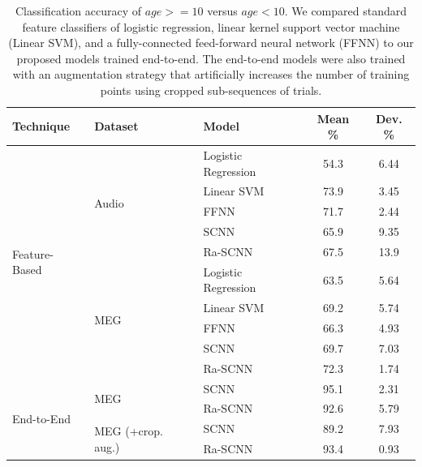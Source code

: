 \documentclass[fleqn,10pt]{wlscirep}
\begin{document}
\begin{table}[htp]
  \caption{Classification accuracy of $age >= 10$ versus $age < 10$. We compared standard feature classifiers of logistic regression, linear kernel support vector machine (Linear SVM), and a fully-connected feed-forward neural network (FFNN) to our proposed models trained end-to-end. The end-to-end models were also trained with an augmentation strategy that artificially increases the number of training points using cropped sub-sequences of trials.}
  \centering
  \begin{tabular}{l | l  l | c | c }
    \toprule
    \textbf{Technique} & \textbf{Dataset} & \textbf{Model} & \textbf{Mean \%} & \textbf{Dev. \%} \\
    \toprule
    \multirow{10}{*}{Feature-Based} & \multirow{5}{*}{Audio} & Logistic Regression      & 54.3 & 6.44  \\
                                    &                        & Linear SVM               & 73.9 & 3.45  \\
                                    &                        & FFNN                     & 71.7 & 2.44  \\
                                    &                        & SCNN                     & 65.9 & 9.35  \\
                                    &                        & Ra-SCNN                  & 67.5 & 13.9  \\
    \cline{2-5}
                                    & \multirow{5}{*}{MEG}   & Logistic Regression    & 63.5 & 5.64  \\
                                    &                        & Linear SVM             & 69.2 & 5.74  \\
                                    &                        & FFNN                   & 66.3 & 4.93  \\
                                    &                        & SCNN                   & 69.7 & 7.03  \\
                                    &                        & Ra-SCNN                & 72.3 & 1.74  \\    
    \midrule
    \multirow{4}{*}{End-to-End}     & \multirow{2}{*}{MEG}   & SCNN                   & 95.1 & 2.31  \\
                                    &                        & Ra-SCNN                & 92.6 & 5.79  \\     
    \cline{2-5}
                                    & \multirow{2}{*}{MEG (+crop. aug.)}  & SCNN      & 89.2 & 7.93  \\
                                    &                        & Ra-SCNN                & 93.4 & 0.93  \\         
    \bottomrule
  \end{tabular}
  \label{tab:binary_results}
\end{table}
\end{document}
